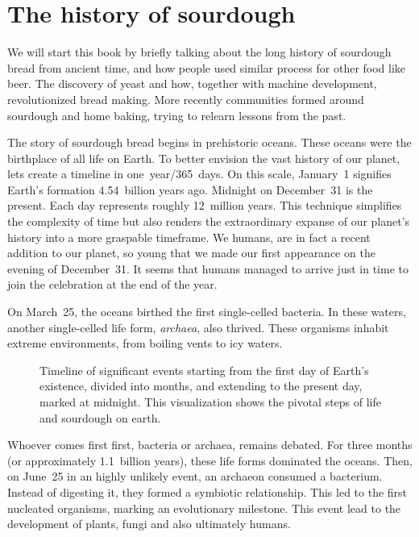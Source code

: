 \chapter{The history of sourdough}%
\label{ch:history}
\begin{quoting}
    We will start this book by briefly talking about the long history of
    sourdough bread from ancient time, and how people used similar process for
    other food like beer. The discovery of yeast and how, together with
    machine development, revolutionized bread making.  More recently
    communities formed around sourdough and home baking, trying to relearn
    lessons from the past.
\end{quoting}

The story of sourdough bread begins in prehistoric oceans. These oceans were the
birthplace of all life on Earth. To better envision the vast history of
our planet, lets create a timeline in one~year/365~days. On this scale,
January~1 signifies Earth's
formation 4.54~billion years ago. Midnight on December~31 is the present.
Each day represents roughly 12~million years. This technique simplifies the
complexity of time but also renders the extraordinary expanse of our planet's
history into a more graspable timeframe. We humans, are in fact a recent
addition to our planet, so young that we made our first appearance on
the evening of December~31.  It seems that humans managed to arrive just
in time to join the celebration at the end of the year.

On March~25, the oceans birthed the first single-celled bacteria. In these
waters, another single-celled life form, \emph{archaea}, also thrived. These
organisms inhabit extreme environments, from boiling vents to icy waters.

\begin{figure}[!htb]
\begin{center}
  
  \caption[Sourdough microbiology timeline]{Timeline of significant events
    starting from the first day of Earth's existence,
    divided into months, and extending to the present day,
    marked at midnight. This visualization shows the pivotal steps
    of life and sourdough on earth.}%
\end{center}
\end{figure}

Whoever comes first first, bacteria or archaea, remains debated. For three
months (or approximately 1.1~billion years), these life forms dominated
the oceans. Then, on June~25 in an highly unlikely event, an archaeon consumed a bacterium.
Instead of digesting it, they formed a symbiotic relationship. This led to the
first nucleated organisms, marking an evolutionary milestone. This event lead
to the development of plants, fungi and also ultimately humans.

